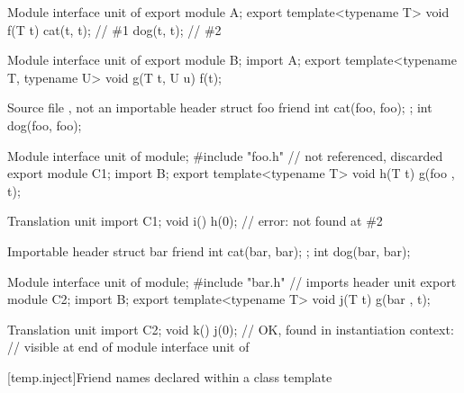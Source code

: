 \pnum
\begin{example}
\begin{codeblocktu}{Module interface unit of }
export module A;
export template<typename T>
void f(T t) {
  cat(t, t);         // \#1
  dog(t, t);         // \#2
}
\end{codeblocktu}

\begin{codeblocktu}{Module interface unit of }
export module B;
import A;
export template<typename T, typename U>
void g(T t, U u) {
  f(t);
}
\end{codeblocktu}

\begin{codeblocktu}{Source file , not an importable header}
struct foo {
  friend int cat(foo, foo);
};
int dog(foo, foo);
\end{codeblocktu}

\begin{codeblocktu}{Module interface unit of }
module;
#include "foo.h" //  not referenced, discarded
export module C1;
import B;
export template<typename T>
void h(T t) {
  g(foo{ }, t);
}
\end{codeblocktu}

\begin{codeblocktu}{Translation unit}
import C1;
void i() {
   h(0);        // error:  not found at \#2
}
\end{codeblocktu}

\begin{codeblocktu}{Importable header }
struct bar {
  friend int cat(bar, bar);
};
int dog(bar, bar);
\end{codeblocktu}

\begin{codeblocktu}{Module interface unit of }
module;
#include "bar.h" // imports header unit 
export module C2;
import B;
export template<typename T>
void j(T t) {
  g(bar{ }, t);
}
\end{codeblocktu}

\begin{codeblocktu}{Translation unit}
import C2;
void k() {
   j(0);        // OK,  found in instantiation context:
                // visible at end of module interface unit of 
}
\end{codeblocktu}
\end{example}

[temp.inject]{Friend names declared within a class template}

